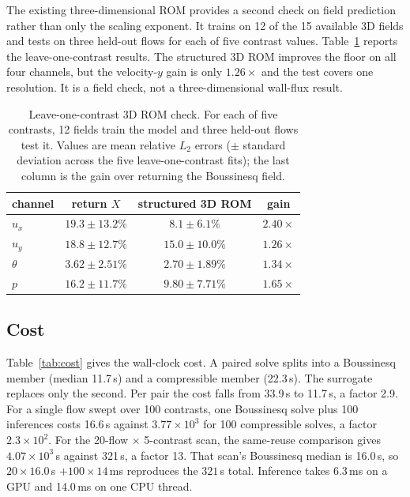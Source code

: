 \documentclass[preprint,11pt,a4paper,times]{elsarticle}
\begin{document}
The existing three-dimensional ROM provides a second check on field prediction rather than only
the scaling exponent. It trains on 12 of the 15 available 3D fields and tests on three held-out
flows for each of five contrast values. Table~\ref{tab:3drom} reports the leave-one-contrast
results. The structured 3D ROM improves the floor on all four channels, but the velocity-$y$
gain is only $1.26\times$ and the test covers one resolution. It is a field check, not a
three-dimensional wall-flux result.

\begin{table}[htbp]
\centering
\caption{Leave-one-contrast 3D ROM check. For each of five contrasts, 12 fields train the model
and three held-out flows test it. Values are mean relative $L_2$ errors ($\pm$ standard
deviation across the five leave-one-contrast fits); the last column is the gain over returning
the Boussinesq field.}
\label{tab:3drom}
\small
\begin{tabular}{@{}lccc@{}}
\toprule
channel & return $X$ & structured 3D ROM & gain\\
\midrule
$u_x$ & $19.3\pm13.2\%$ & $8.1\pm6.1\%$ & $2.40\times$\\
$u_y$ & $18.8\pm12.7\%$ & $15.0\pm10.0\%$ & $1.26\times$\\
$\theta$ & $3.62\pm2.51\%$ & $2.70\pm1.89\%$ & $1.34\times$\\
$p$ & $16.2\pm11.7\%$ & $9.80\pm7.71\%$ & $1.65\times$\\
\bottomrule
\end{tabular}
\end{table}

\subsection{Cost}
\label{sec:cost}

Table~\ref{tab:cost} gives the wall-clock cost. A paired solve splits into a Boussinesq member
(median 11.7\,s) and a compressible member (22.3\,s). The surrogate replaces only the second.
Per pair the cost falls from 33.9\,s to 11.7\,s, a factor 2.9. For a single flow swept over
100 contrasts, one Boussinesq solve plus 100 inferences costs 16.6\,s against $3.77\times10^3$
for 100 compressible solves, a factor $2.3\times10^2$. For the 20-flow $\times$ 5-contrast
scan, the same-reuse comparison gives $4.07\times10^3$\,s against 321\,s, a factor 13. That
scan's Boussinesq median is 16.0\,s, so $20\times16.0$\,s $+100\times14$\,ms reproduces the
$321$\,s total. Inference takes 6.3\,ms on a GPU and 14.0\,ms on one CPU thread.
\end{document}
